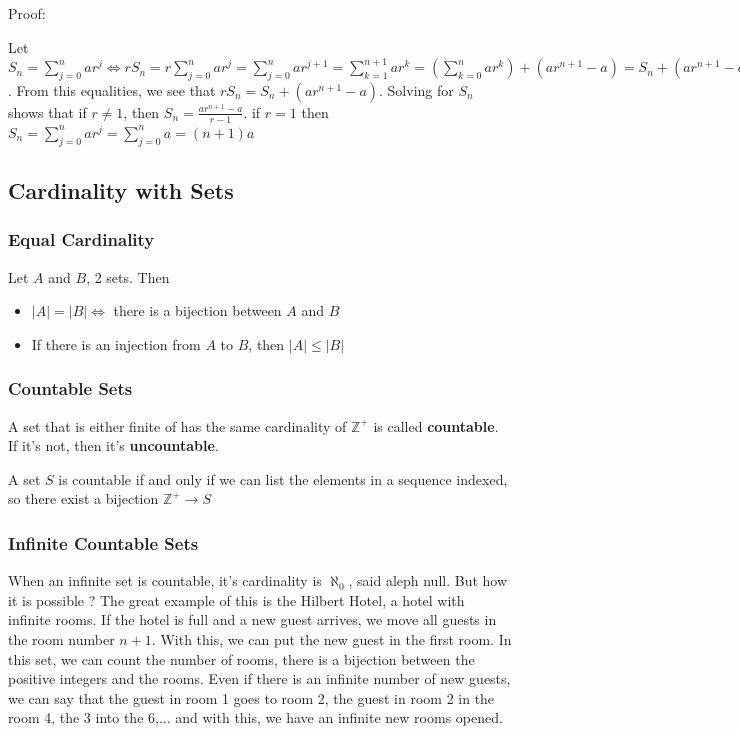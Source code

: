 \documentclass{article}
\begin{document}
Proof:
\begin{tcolorbox}[width=12.1cm]
Let $ S_n = \sum_{j=0}^{n} ar^j \Leftrightarrow rS_n = r \sum_{j=0}^{n} ar^j = \sum_{j=0}^{n} ar^{j+1} = \sum_{k=1}^{n+1} ar^k = (\sum_{k=0}^{n} ar^k) + (ar^{n+1} -a) = S_n + (ar^{n+1} -a) $. From this equalities, we see that $ rS_n = S_n + (ar^{n+1} -a) $. Solving for $ S_n $ shows that if $ r \neq 1 $, then $ S_n = \frac{ar^{n+1} - a}{r - 1} $. if $ r = 1 $ then $ S_n = \sum_{j=0}^{n} ar^j = \sum_{j=0}^{n} a = (n + 1)a $
\end{tcolorbox}

\subsection{Cardinality with Sets}
\subsubsection{Equal Cardinality}
\begin{tcolorbox}[sharp corners, colback=green!30, colframe=green!80!blue, title=Value of Cardinality between 2 sets]
Let $ A $ and $ B $, 2 sets. Then
\begin{itemize}
\item $ |A| = |B| \Leftrightarrow $ there is a bijection between $ A $ and $ B $
\item If there is an injection from $ A $ to $ B $, then $ |A| \leq |B| $
\end{itemize}
\end{tcolorbox}

\subsubsection{Countable Sets} A set that is either finite of has the same cardinality of $ \mathbb{Z^+} $ is called \textbf{countable}. If it's not, then it's \textbf{uncountable}.
\begin{tcolorbox}[sharp corners, colback=green!30, colframe=green!80!blue, title=Countable Sets]
A set $ S $ is countable if and only if we can list the elements in a sequence indexed, so there exist a bijection $ \mathbb{Z^+} \rightarrow S $
\end{tcolorbox}

\subsubsection{Infinite Countable Sets} When an infinite set is countable, it's cardinality is $ \aleph_0 $, said aleph null. But how it is possible ? The great example of this is the Hilbert Hotel, a hotel with infinite rooms. If the hotel is full and a new guest arrives, we move all guests in the room number $ n + 1 $. With this, we can put the new guest in the first room. In this set, we can count the number of rooms, there is a bijection between the positive integers and the rooms. Even if there is an infinite number of new guests, we can say that the guest in room 1 goes to room 2, the guest in room 2 in the room 4, the 3 into the 6,... and with this, we have an infinite new rooms opened.
\end{document}
